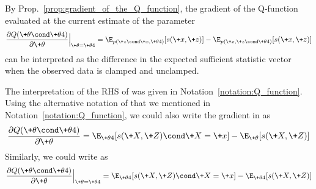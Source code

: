 \documentclass{article} %
\newcommand{\sufficientStatsFunction}{s}
\begin{document}
\begin{corollary}
By Prop.~\ref{prop:gradient_of_the_Q_function}, the gradient of the Q-function evaluated at the current estimate of the parameter
%
\begin{align}
\frac{\partial Q(\+\theta \cond \+\theta^^t)}{\partial \+\theta} \Bigr|_{\+\theta = \+\theta^^t} =  \E_{p(\+z \cond \+x, \+\theta^^t)}[\sufficientStatsFunction(\+x,\+z)] - 	\E_{p(\+x, \+z \cond \+\theta^^t)}[\sufficientStatsFunction(\+x,\+z)] 
\label{eqn:gradient_of_Q_function_as_difference_in_expected_sufficient_stats_with_clamped_and_unclamped_data}
\end{align}
%
can be interpreted as the difference in the expected sufficient statistic vector when the observed data is clamped and unclamped.
\end{corollary}



\begin{notation}
The interpretation of the RHS of  was given in Notation~\ref{notation:Q_function}.     Using the alternative notation of \citet{miller2011why} that we mentioned in Notation~\ref{notation:Q_function}, we could also write the gradient in  as 
 \begin{align}
 \frac{\partial Q(\+\theta \cond \+\theta^^t)}{\partial \+\theta} =  \E_{\+\theta^^t}[\sufficientStatsFunction(\+X,\+Z) \cond \+X=\+x] - 	\E_{\+\theta}[\sufficientStatsFunction(\+X,\+Z)]
 \label{eqn:gradient_of_Q_function_for_EM_in_jeff_millers_notation}
 \end{align}
 Similarly, we could write  as
 \begin{align}
 \frac{\partial Q(\+\theta \cond \+\theta^^t)}{\partial \+\theta} \Bigr|_{\+\theta = \+\theta^^t} =  \E_{\+\theta^^t}[\sufficientStatsFunction(\+X,\+Z) \cond \+X=\+x] - 	\E_{\+\theta^^t}[\sufficientStatsFunction(\+X,\+Z)]
 \label{eqn:the_gradient_of_the_Q_function_evaluated_at_the_current_parameter_and_using_jeffs_notation}
 \end{align}
\end{notation}

\end{document}
